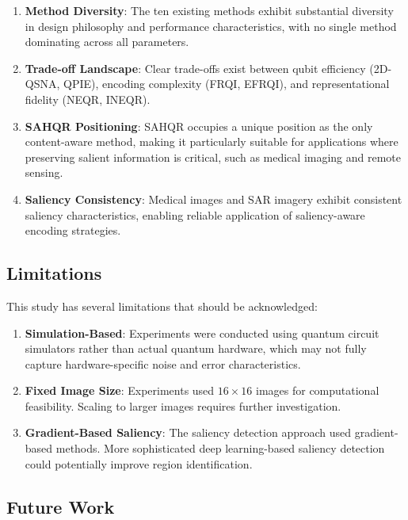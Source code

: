 \documentclass[pdflatex,sn-mathphys-num,Numbered]{sn-jnl}
\theoremstyle{thmstyleone}
\theoremstyle{thmstyletwo}
\theoremstyle{thmstylethree}
\begin{document}
\begin{enumerate}
\item \textbf{Method Diversity}: The ten existing methods exhibit substantial diversity in design philosophy and performance characteristics, with no single method dominating across all parameters.

\item \textbf{Trade-off Landscape}: Clear trade-offs exist between qubit efficiency (2D-QSNA, QPIE), encoding complexity (FRQI, EFRQI), and representational fidelity (NEQR, INEQR).

\item \textbf{SAHQR Positioning}: SAHQR occupies a unique position as the only content-aware method, making it particularly suitable for applications where preserving salient information is critical, such as medical imaging and remote sensing.

\item \textbf{Saliency Consistency}: Medical images and SAR imagery exhibit consistent saliency characteristics, enabling reliable application of saliency-aware encoding strategies.
\end{enumerate}

\subsection{Limitations}

This study has several limitations that should be acknowledged:

\begin{enumerate}
\item \textbf{Simulation-Based}: Experiments were conducted using quantum circuit simulators rather than actual quantum hardware, which may not fully capture hardware-specific noise and error characteristics.

\item \textbf{Fixed Image Size}: Experiments used $16 \times 16$ images for computational feasibility. Scaling to larger images requires further investigation.

\item \textbf{Gradient-Based Saliency}: The saliency detection approach used gradient-based methods. More sophisticated deep learning-based saliency detection could potentially improve region identification.
\end{enumerate}

\subsection{Future Work}
\end{document}
